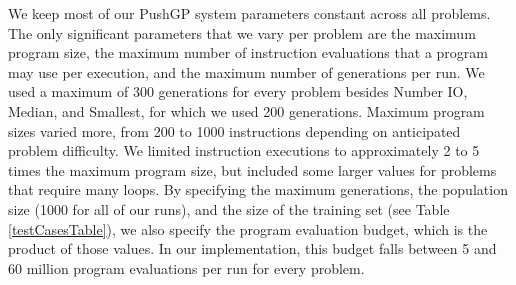\documentclass{sig-alternate}
\begin{document}

We keep most of our PushGP system parameters constant across all problems. The only significant parameters that we vary per problem are the maximum program size, the maximum number of instruction evaluations that a program may use per execution, and the maximum number of generations per run. We used a maximum of 300 generations for every problem besides Number IO, Median, and Smallest, for which we used 200 generations. Maximum program sizes varied more, from 200 to 1000 instructions depending on anticipated problem difficulty. We limited instruction executions to approximately 2 to 5 times the maximum program size, but included some larger values for problems that require many loops. 
By specifying the maximum generations, the population size (1000 for all of our runs), and the size of the training set (see Table \ref{testCasesTable}), we also specify the program evaluation budget, which is the product of those values. In our implementation, this budget falls between 5 and 60 million program evaluations per run for every problem. 
\end{document}
